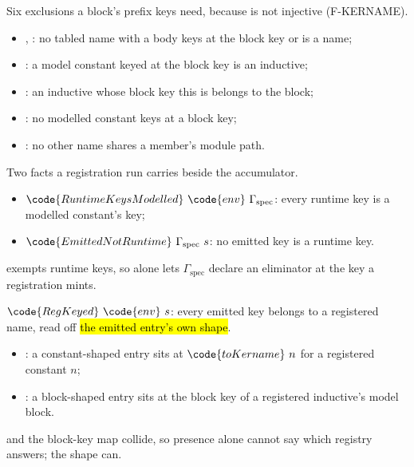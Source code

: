 \begin{definition}
\label{def:BodiedKeysFresh}
\leanok
{}
 Six exclusions a block's prefix keys need, because  is not injective
(F-KERNAME).
\begin{itemize}
\item {}, : no tabled name with a body keys at the block key or is a
 name;
\item {}: a model constant keyed at the block key is an inductive;
\item {}: an inductive whose block key this is belongs to the block;
\item {}: no modelled  constant keys at a block key;
\item {}: no other name shares a member's module path.
\end{itemize}
\end{definition}
\begin{definition}
\label{def:RuntimeKeysModelled}
\leanok
{}
 Two facts a registration run carries beside the accumulator.
\begin{itemize}
\item $\code{RuntimeKeysModelled}\ \code{env}\ \Gamma_{\mathrm{spec}}$: every runtime key is a modelled
 constant's key;
\item $\code{EmittedNotRuntime}\ \Gamma_{\mathrm{spec}}\ s$: no emitted key is a runtime key.
\end{itemize}
  exempts runtime keys, so  alone lets $\Gamma_{\mathrm{spec}}$
declare an eliminator at the key a registration mints.
\end{definition}
\begin{definition}
\label{def:RegKeyed}
\leanok
{}
 $\code{RegKeyed}\ \code{env}\ s$: every emitted key belongs to a registered name, read off
\hl{the emitted entry's own shape}.
\begin{itemize}
\item {}: a constant-shaped entry sits at $\code{toKername}\ n$ for a registered constant $n$;
\item {}: a block-shaped entry sits at the block key of a registered inductive's model block.
\end{itemize}
  and the block-key map collide, so presence alone cannot say which registry
answers; the shape can.
\end{definition}
